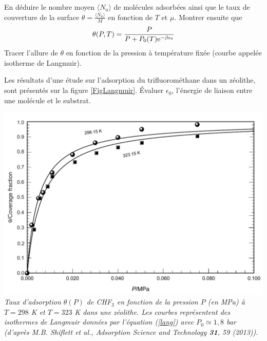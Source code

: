\documentclass[utf8, 11pt]{feuille}
\begin{document}
\question
En déduire le nombre moyen $\langle N_a \rangle$ de molécules adsorbées ainsi que le taux de couverture de la surface $\theta=\frac{\langle N_a \rangle}{M}$  en fonction de $T$ et $\mu$. Montrer ensuite que
\begin{equation} \label{lang} 
  \displaystyle \theta(P,T)=   \displaystyle{\frac{P} {P+ P_0(T) {\rm e}^{-\beta \epsilon_0}}}
\end{equation}
Tracer l'allure de $\theta$ en fonction de la pression à température
fixée (courbe appelée isotherme de Langmuir).

\question
Les résultats d'une étude sur l'adsorption du trifluorométhane dans un zéolithe, sont présentés sur la figure \ref{FigLangmuir}. \'Evaluer $\epsilon_0$, l'énergie de liaison entre une
  molécule et le substrat.


\begin{center}
\includegraphics{Fig_Langmuir} \\
\textit{Taux d'adsorption $\theta(P)$  de CHF$_3$ en fonction de la pression $P$ (en MPa) à $T=298$ K et $T=323$ K dans une zéolithe. Les courbes représentent des isothermes de Langmuir données par l'équation (\ref{lang}) avec $P_0 \simeq 1,8$ bar (d'après M.B. Shiflett et al., Adsorption Science and Technology {\bf 31}, 59 (2013)). \label{FigLangmuir}}
\end{center}
\end{document}
